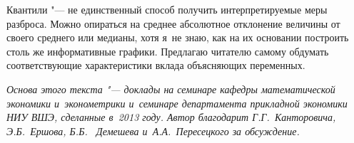 \documentclass[11pt]{article}
\begin{document}
Квантили "--- не единственный способ получить интерпретируемые меры разброса. Можно опираться на среднее абсолютное отклонение величины от своего среднего или медианы, хотя я~не знаю, как на их основании построить столь же информативные графики. Предлагаю читателю самому обдумать соответствующие характеристики вклада объясняющих переменных.

\medskip
\textit{Основа этого текста "--- доклады на семинаре кафедры математической экономики и~эконометрики и~семинаре департамента прикладной экономики НИУ ВШЭ, сделанные в~2013 году. Автор благодарит Г.Г.~Канторовича, Э.Б.~Ершова, Б.Б.~ Демешева и~А.А.~Пересецкого за обсуждение.}


\printbibliography
\end{document}
